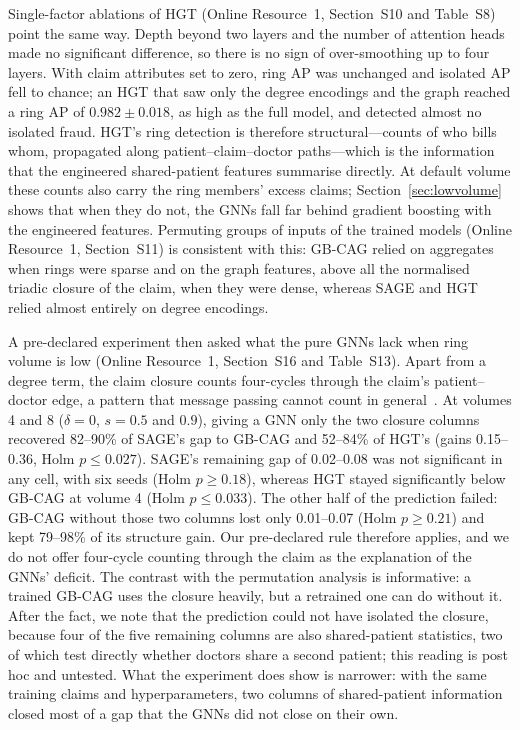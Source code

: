 \documentclass[pdflatex,sn-vancouver-num]{sn-jnl}
\newcommand{\SSecHGT}{S10}\newcommand{\STabHGT}{S8}
\newcommand{\SSecReliance}{S11}
\newcommand{\SSecClosure}{S16}\newcommand{\STabClosure}{S13}
\begin{document}
Single-factor ablations of HGT (Online Resource~1, Section~\SSecHGT{} and
Table~\STabHGT) point the same way. Depth beyond two layers and the number of
attention heads made no significant difference, so there is no sign of
over-smoothing up to four layers. With claim attributes set to zero, ring AP
was unchanged and isolated AP fell to chance; an HGT that saw only the degree
encodings and the graph reached a ring AP of $0.982\pm0.018$, as high as the
full model, and detected almost no isolated fraud. HGT's ring detection is
therefore structural---counts of who bills whom, propagated along
patient--claim--doctor paths---which is the information that the engineered
shared-patient features summarise directly. At default volume these counts
also carry the ring members' excess claims; Section~\ref{sec:lowvolume}
shows that when they do not, the GNNs fall far behind gradient boosting with
the engineered features. Permuting groups of inputs of the trained models
(Online Resource~1, Section~\SSecReliance) is consistent with this: GB-CAG relied on
aggregates when rings were sparse and on the graph features, above all the
normalised triadic closure of the claim, when they were dense, whereas SAGE
and HGT relied almost entirely on degree encodings.

A pre-declared experiment then asked what the pure GNNs lack when ring volume
is low (Online Resource~1, Section~\SSecClosure{} and Table~\STabClosure).
Apart from a degree term, the claim closure counts four-cycles through the
claim's patient--doctor edge, a pattern that message passing cannot count in
general~\cite{chen2020count}. At volumes 4 and 8 ($\delta=0$, $s=0.5$ and
$0.9$), giving a GNN only the two closure columns recovered 82--90\% of SAGE's
gap to GB-CAG and 52--84\% of HGT's (gains 0.15--0.36, Holm $p\le0.027$). SAGE's
remaining gap of 0.02--0.08 was not significant in any cell, with six seeds
(Holm $p\ge0.18$), whereas HGT stayed significantly below GB-CAG at volume 4
(Holm $p\le0.033$). The other half of the prediction failed: GB-CAG without those two columns lost
only 0.01--0.07 (Holm $p\ge0.21$) and kept 79--98\% of its structure gain. Our
pre-declared rule therefore applies, and we do not offer four-cycle counting
through the claim as the explanation of the GNNs' deficit. The contrast with the permutation
analysis is informative: a trained GB-CAG uses the closure heavily, but a
retrained one can do without it. After the fact, we note that the prediction could not have
isolated the closure, because four of the five remaining columns are also
shared-patient statistics, two of which test directly whether doctors share a
second patient; this reading is post hoc and untested. What the experiment
does show is narrower: with the same training claims and hyperparameters, two
columns of shared-patient information closed most of a gap that the GNNs did
not close on their own.
\end{document}
